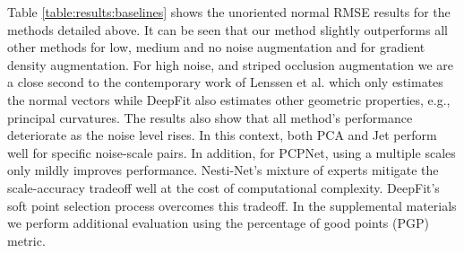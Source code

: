Table \ref{table:results:baselines} shows the unoriented normal RMSE results for the methods detailed above. It can be seen that our method slightly outperforms all other methods for low, medium and no noise augmentation and for gradient density augmentation. For high noise, and striped occlusion augmentation we are a close second to the contemporary work  of Lenssen et al. \cite{lenssen2019differentiable} which only estimates the normal vectors while DeepFit also estimates other geometric properties, e.g., principal curvatures. 
The results also show that all method's performance deteriorate as the noise level rises. In this context, both PCA and Jet perform well for specific noise-scale pairs. In addition, for PCPNet, using a multiple scales only mildly improves performance. Nesti-Net's mixture of experts mitigate the scale-accuracy tradeoff well at the cost of computational complexity. DeepFit's soft point selection process overcomes this tradeoff. In the supplemental materials we perform additional evaluation using the percentage of good points (PGP) metric.

